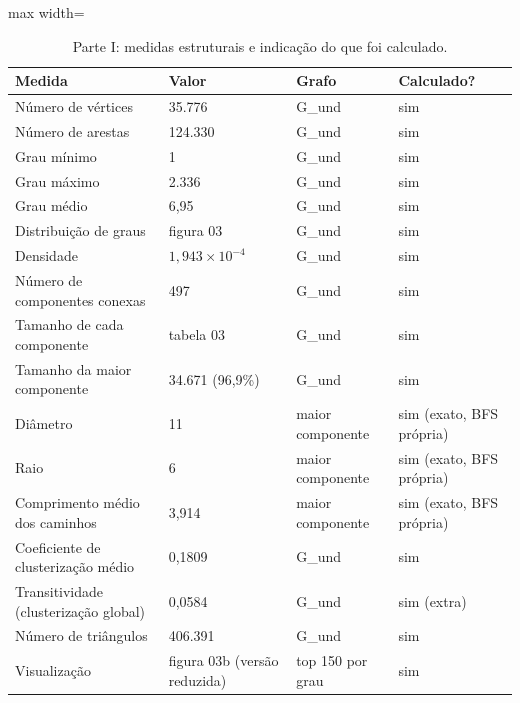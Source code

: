 \begin{table}[t]
\centering
\small
\caption{Parte I: medidas estruturais e indicação do que foi calculado.}
\label{tab:parte1}
\begin{adjustbox}{max width=\linewidth}
\begin{tabular}{llll}
\toprule
Medida & Valor & Grafo & Calculado? \\
\midrule
Número de vértices & 35.776 & G\_und & sim \\
Número de arestas & 124.330 & G\_und & sim \\
Grau mínimo & 1 & G\_und & sim \\
Grau máximo & 2.336 & G\_und & sim \\
Grau médio & 6,95 & G\_und & sim \\
Distribuição de graus & figura 03 & G\_und & sim \\
Densidade & $1,943 \times 10^{-4}$ & G\_und & sim \\
Número de componentes conexas & 497 & G\_und & sim \\
Tamanho de cada componente & tabela 03 & G\_und & sim \\
Tamanho da maior componente & 34.671 (96,9\%) & G\_und & sim \\
Diâmetro & 11 & maior componente & sim (exato, BFS própria) \\
Raio & 6 & maior componente & sim (exato, BFS própria) \\
Comprimento médio dos caminhos & 3,914 & maior componente & sim (exato, BFS própria) \\
Coeficiente de clusterização médio & 0,1809 & G\_und & sim \\
Transitividade (clusterização global) & 0,0584 & G\_und & sim (extra) \\
Número de triângulos & 406.391 & G\_und & sim \\
Visualização & figura 03b (versão reduzida) & top 150 por grau & sim \\
\bottomrule
\end{tabular}
\end{adjustbox}
\end{table}
